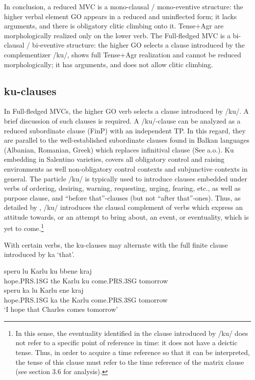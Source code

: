 \documentclass[output=paper]{langscibook}
\begin{document}
In conclusion, a reduced MVC is a mono-clausal / mono-eventive structure: the higher verbal element GO appears in a reduced and uninflected form; it lacks arguments, and there is obligatory clitic climbing onto it.   Tense+Agr are morphologically realized only on the lower verb.  The Full-fledged MVC is a bi-clausal / bi-eventive structure: the higher GO selects a clause introduced by the complementizer /ku/, shows full Tense+Agr realization and cannot be reduced morphologically; it has arguments, and does not allow clitic climbing. 

\subsection{ku-clauses}

In Full-fledged MVCs, the higher GO verb selects a clause introduced by /ku/.  A brief discussion of such clauses is required.  A /ku/-clause can be analyzed as a reduced subordinate clause (FinP) with an independent TP.  In this regard, they are parallel to the well-established subordinate clauses found in Balkan languages (Albanian, Romanian, Greek) which replaces infinitival clause (See \cite{calabrese1993a, rivero1994a, manzini2005a, roberts2003a} a.o.). Ku embedding in Salentino varieties, covers all obligatory control and raising environments as well non-obligatory control contexts and subjunctive contexts in general. The particle /ku/ is typically used to introduce clauses embedded under verbs of ordering, desiring, warning, requesting, urging, fearing, etc., as well as purpose clause, and “before that”-clauses (but not “after that”-ones). Thus, as detailed by \citet{calabrese1993a}, /ku/ introduces the clausal complement of verbs which express an attitude towards, or an attempt to bring about, an event, or eventuality, which is yet to come.\footnote{In this sense, the eventuality identified in the clause introduced by /ku/ does not refer to a specific point of reference in time: it does not have a deictic tense.  Thus, in order to acquire a time reference so that it can be interpreted, the tense of this clause must refer to the time reference of the matrix clause (see section 3.6 for analysis).}

With certain verbs, the ku-clauses may alternate with the full finite clause introduced by ka ‘that’. 

\ea\label{ac11}
    \ea \label{ac11a}\gll speru   lu  Karlu   ku  bbene      kraj \\
       hope.PRS.1SG    the  Karlu   ku  come.PRS.3SG  tomorrow\\
    \ex \label{ac11b}\gll speru       ka   lu  Karlu ene       kraj \\
     hope.PRS.1SG    ka   the  Karlu  come.PRS.3SG  tomorrow\\
   \glt ‘I hope that Charles comes tomorrow’
    \z
\z
\end{document}
